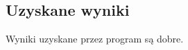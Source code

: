 \documentclass{article}
\begin{document}
\subsection{Uzyskane wyniki}
Wyniki uzyskane przez program są dobre.
\end{document}

